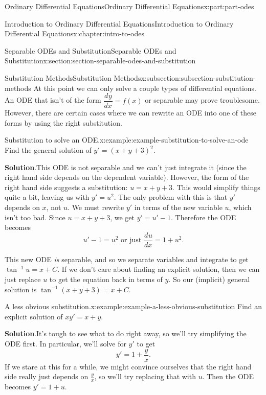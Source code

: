 \documentclass[oneside,10pt,]{book}
\newcommand{\blocktitlefont}{\relax}
\numberwithin{equation}{part}
\newcommand{\dv}[3][]{\dfrac{d^{#1} #2}{d #3^{#1}}}
\begin{document}
\begin{partptx}{Ordinary Differential Equations}{}{Ordinary Differential Equations}{}{}{x:part:part-odes}
\begin{chapterptx}{Introduction to Ordinary Differential Equations}{}{Introduction to Ordinary Differential Equations}{}{}{x:chapter:intro-to-odes}
\begin{sectionptx}{Separable ODEs and Substitution}{}{Separable ODEs and Substitution}{}{}{x:section:section-separable-odes-and-substitution}
\typeout{************************************************}
%
\begin{subsectionptx}{Substitution Methods}{}{Substitution Methods}{}{}{x:subsection:subsection-substitution-methods}
At this point we can only solve a couple types of differential equations. An ODE that isn't of the form \(\dv{y}{x} = f(x)\) or separable may prove troublesome. However, there are certain cases where we can rewrite an ODE into one of these forms by using the right substitution.%
\begin{example}{Substitution to solve an ODE.}{x:example:example-substitution-to-solve-an-ode}%
Find the general solution of \(y' = (x+y+3)^{2}\).%
\par\smallskip%
\noindent\textbf{\blocktitlefont Solution}.\hypertarget{g:solution:idp105548780103584}{}\quad{}This ODE is not separable and we can't just integrate it (since the right hand side depends on the dependent variable). However, the form of the right hand side suggests a substitution: \(u = x+y+3\). This would simplify things quite a bit, leaving us with \(y'=u^{2}\). The only problem with this is that \(y'\) depends on \(x\), not \(u\). We must rewrite \(y'\) in terms of the new variable \(u\), which isn't too bad. Since \(u = x+y+3\), we get \(y' = u'-1\). Therefore the ODE becomes%
\begin{equation*}
u'-1 = u^{2}\text{ or just }\dv{u}{x} = 1+u^{2}.
\end{equation*}
%
\par
This new ODE \emph{is} separable, and so we separate variables and integrate to get \(\tan^{-1}u = x+C\). If we don't care about finding an explicit solution, then we can just replace \(u\) to get the equation back in terms of \(y\). So our (implicit) general solution is \(\tan^{-1}(x+y+3) = x+C\).%
\end{example}
\begin{example}{A less obvious substitution.}{x:example:example-a-less-obvious-substitution}%
Find an explicit solution of \(xy'=x+y\).%
\par\smallskip%
\noindent\textbf{\blocktitlefont Solution}.\hypertarget{g:solution:idp105548780111264}{}\quad{}It's tough to see what to do right away, so we'll try simplifying the ODE first. In particular, we'll solve for \(y'\) to get%
\begin{equation*}
y' = 1+\frac{y}{x}.
\end{equation*}
If we stare at this for a while, we might convince ourselves that the right hand side really just depends on \(\frac{y}{x}\), so we'll try replacing that with \(u\). Then the ODE becomes \(y'=1+u\).%

\end{example}
\end{subsectionptx}
\end{sectionptx}
\end{chapterptx}
\end{partptx}
\end{document}
